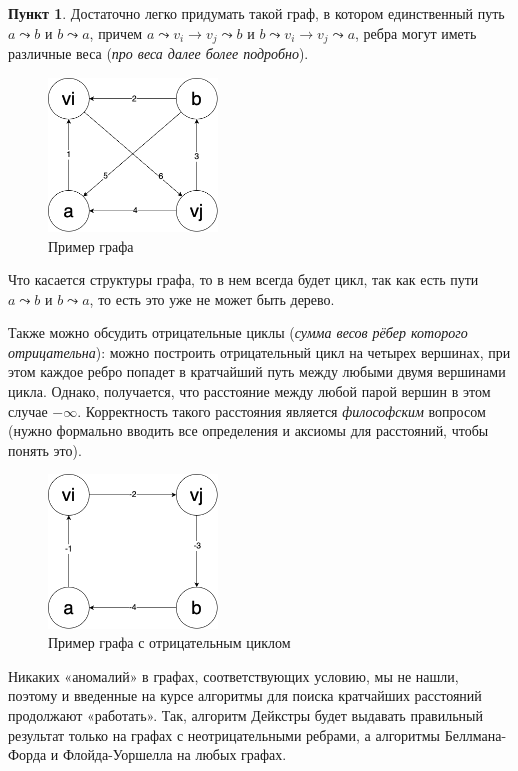 \documentclass[11pt,a4paper]{scrarticle}
\theoremstyle{definition}
\newtheorem{subtask}{Пункт}
\begin{document}
\begin{subtask}
    Достаточно легко придумать такой граф, в котором единственный путь $a \leadsto b$ и $b \leadsto a$, причем $a \leadsto v_i \rightarrow v_j \leadsto b$ и $b \leadsto v_i \rightarrow v_j \leadsto a$, ребра могут иметь различные веса (\textit{про веса далее более подробно}).

    \begin{figure}[htp]
        \centering
        \includegraphics[width=0.4\textwidth]{static/p4-example1.png}
        \caption{Пример графа}
        \label{fig:graph}
    \end{figure}
    \FloatBarrier

    Что касается структуры графа, то в нем всегда будет цикл, так как есть пути $a \leadsto b$ и $b \leadsto a$, то есть это уже не может быть дерево.

    Также можно обсудить отрицательные циклы (\textit{сумма весов рёбер которого отрицательна}): можно построить отрицательный цикл на четырех вершинах, при этом каждое ребро попадет в кратчайший путь между любыми двумя вершинами цикла. Однако, получается, что расстояние между любой парой вершин в этом случае $-\infty$. Корректность такого расстояния является \textit{философским} вопросом (нужно формально вводить все определения и аксиомы для расстояний, чтобы понять это).

    \begin{figure}[htp]
        \centering
        \includegraphics[width=0.4\textwidth]{static/p4-example2.png}
        \caption{Пример графа с отрицательным циклом}
        \label{fig:graph}
    \end{figure}
    \FloatBarrier

    Никаких «аномалий» в графах, соответствующих условию, мы не нашли, поэтому и введенные на курсе алгоритмы для поиска кратчайших расстояний продолжают «работать». Так, алгоритм Дейкстры будет выдавать правильный результат только на графах с неотрицательными ребрами, а алгоритмы Беллмана-Форда и Флойда-Уоршелла на любых графах.
\end{subtask}
\end{document}
